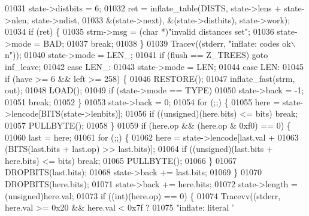 \begin{DoxyCode}
{{{{{{{{01031             state->distbits = 6;
01032             ret = inflate\_table(DISTS, state->lens + state->nlen, state->ndist,
01033                             &(state->next), &(state->distbits), state->work);
01034             \textcolor{keywordflow}{if} (ret) \{
01035                 strm->msg = (\textcolor{keywordtype}{char} *)\textcolor{stringliteral}{"invalid distances set"};
01036                 state->mode = BAD;
01037                 \textcolor{keywordflow}{break};
01038             \}
01039             Tracev((stderr, \textcolor{stringliteral}{"inflate:       codes ok\(\backslash\)n"}));
01040             state->mode = LEN\_;
01041             \textcolor{keywordflow}{if} (flush == Z\_TREES) \textcolor{keywordflow}{goto} inf\_leave;
01042         \textcolor{keywordflow}{case} LEN\_:
01043             state->mode = LEN;
01044         \textcolor{keywordflow}{case} LEN:
01045             \textcolor{keywordflow}{if} (have >= 6 && left >= 258) \{
01046                 RESTORE();
01047                 inflate\_fast(strm, out);
01048                 LOAD();
01049                 \textcolor{keywordflow}{if} (state->mode == TYPE)
01050                     state->back = -1;
01051                 \textcolor{keywordflow}{break};
01052             \}
01053             state->back = 0;
01054             \textcolor{keywordflow}{for} (;;) \{
01055                 here = state->lencode[BITS(state->lenbits)];
01056                 \textcolor{keywordflow}{if} ((\textcolor{keywordtype}{unsigned})(here.bits) <= bits) \textcolor{keywordflow}{break};
01057                 PULLBYTE();
01058             \}
01059             \textcolor{keywordflow}{if} (here.op && (here.op & 0xf0) == 0) \{
01060                 last = here;
01061                 \textcolor{keywordflow}{for} (;;) \{
01062                     here = state->lencode[last.val +
01063                             (BITS(last.bits + last.op) >> last.bits)];
01064                     \textcolor{keywordflow}{if} ((\textcolor{keywordtype}{unsigned})(last.bits + here.bits) <= bits) \textcolor{keywordflow}{break};
01065                     PULLBYTE();
01066                 \}
01067                 DROPBITS(last.bits);
01068                 state->back += last.bits;
01069             \}
01070             DROPBITS(here.bits);
01071             state->back += here.bits;
01072             state->length = (unsigned)here.val;
01073             if ((\textcolor{keywordtype}{int})(here.op) == 0) \{
01074                 Tracevv((stderr, here.val >= 0x20 && here.val < 0x7f ?
01075                         \textcolor{stringliteral}{"inflate:         literal '%
}}}}}}}}}
\end{DoxyCode}
